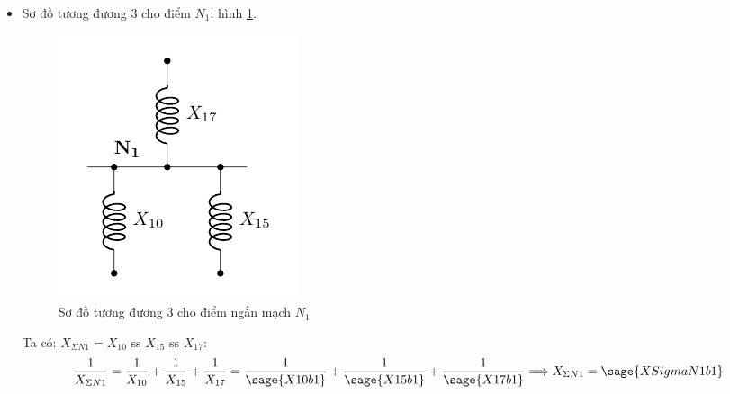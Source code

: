 \documentclass[12pt,a4paper]{article}
\begin{document}
\begin{itemize}
\begin{itemize}
\begin{itemize}

				\newpage
				\item Sơ đồ tương đương 3 cho điểm $N_1$: hình \ref{Fig:sodo-tuongduong-bt1-N1-3}.
					\begin{figure}[!h]
						\vspace{-.5cm}
						\begin{center}
							\includegraphics[scale=1]{figure-baitap-nganmach-1-N1-3.pdf} 
							\vspace{-.5cm}
						\end{center}
						\caption{Sơ đồ tương đương 3 cho điểm ngắn mạch $N_1$} \label{Fig:sodo-tuongduong-bt1-N1-3}
					\end{figure}

					Ta có: $X_{\Sigma N1} = X_{10} \textrm{ ss } X_{15} \textrm{ ss } X_{17}:$ $$ \dfrac{1}{X_{\Sigma N1}} = \dfrac{1}{X_{10}} + \dfrac{1}{X_{15}} + \dfrac{1}{X_{17}} = \dfrac{1}{\sage{X10b1}} + \dfrac{1}{\sage{X15b1}} + \dfrac{1}{\sage{X17b1}} \Longrightarrow X_{\Sigma N1} = \sage{XSigmaN1b1}$$
				\end{itemize}
			

\end{itemize}
\end{itemize}
\end{document}
